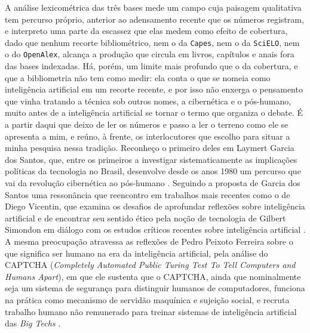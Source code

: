 A análise lexicométrica das três bases mede um campo cuja paisagem qualitativa tem percurso próprio, anterior ao adensamento recente que os números registram, e interpreto uma parte da escassez que elas medem como efeito de cobertura, dado que nenhum recorte bibliométrico, nem o da \texttt{Capes}, nem o da \texttt{SciELO}, nem o do \texttt{OpenAlex}, alcança a produção que circula em livros, capítulos e anais fora das bases indexadas. Há, porém, um limite mais profundo que o da cobertura, e que a bibliometria não tem como medir: ela conta o que se nomeia como inteligência artificial em um recorte recente, e por isso não enxerga o pensamento que vinha tratando a técnica sob outros nomes, a cibernética e o pós-humano, muito antes de a inteligência artificial se tornar o termo que organiza o debate. É a partir daqui que deixo de ler os números e passo a ler o terreno como ele se apresenta a mim, e reúno, à frente, os interlocutores que escolho para situar a minha pesquisa nessa tradição. Reconheço o primeiro deles em Laymert Garcia dos Santos, que, entre os primeiros a investigar sistematicamente as implicações políticas da tecnologia no Brasil, desenvolve desde os anos 1980 um percurso que vai da revolução cibernética ao pós-humano \parencite{Santos_2005_Entrevista, Santos_2022_SociologiaNaoAutocratica}. Seguindo a proposta de Garcia dos Santos uma ressonância que reencontro em trabalhos mais recentes como o de Diego Vicentin, que examina os desafios de aprofundar reflexões sobre inteligência artificial e de encontrar seu sentido ético pela noção de tecnologia de Gilbert Simondon em diálogo com os estudos críticos recentes sobre inteligência artificial \parencite{Vicentin_2022_Esboco}. A mesma preocupação atravessa as reflexões de Pedro Peixoto Ferreira sobre o que significa ser humano na era da inteligência artificial, pela análise do CAPTCHA (\textit{Completely Automated Public Turing Test To Tell Computers and Humans Apart}), em que ele sustenta que o CAPTCHA, ainda que nominalmente seja um sistema de segurança para distinguir humanos de computadores, funciona na prática como mecanismo de servidão maquínica e sujeição social, e recruta trabalho humano não remunerado para treinar sistemas de inteligência artificial das \textit{Big Techs} \parencite{Ferreira_2025_NaoSouUmRobo}.

